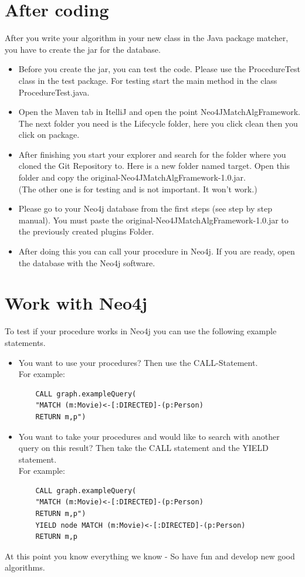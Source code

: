 \section{After coding}\label{sec:afterProgramming}
After you write your algorithm in your new class in the Java package matcher, you have to create the \glqq jar\grqq{} for the database.
\begin{itemize}
	\item Before you create the jar, you can test the code. Please use the \glqq ProcedureTest\grqq{} class in the test package. For testing start the main method in the class \glqq ProcedureTest.java\grqq{}.
	\item Open the Maven tab in \glqq ItelliJ \grqq{} and open the point \glqq Neo4JMatchAlgFramework\grqq{}. The next folder you need is the \glqq Lifecycle\grqq{} folder, here you click \glqq clean\grqq{} then you click on \glqq package\grqq{}.
	\item After finishing you start your explorer and search for the folder where you cloned the \glqq Git Repository\grqq{} to. Here is a new folder named target. Open this folder and copy the \glqq original-Neo4JMatchAlgFramework-1.0.jar\grqq{}. \\
	(The other one is for testing and is not important. It won't work.)
	\item Please go to your Neo4j database from the first steps (see step by step manual).%
	 You must paste the \glqq original-Neo4JMatchAlgFramework-1.0.jar\grqq{} to the previously created \glqq plugins\grqq{} Folder.
	\item After doing this you can call your procedure in Neo4j. If you are ready, open the database with the Neo4j software.
\end{itemize}

\section{Work with Neo4j}\label{sec:takeneo4j}
To test if your procedure works in Neo4j you can use the following example statements.
\begin{itemize}
	\item You want to use your procedures? Then use the CALL-Statement.\\
	For example:
	\begin{lstlisting}
	CALL graph.exampleQuery(
	"MATCH (m:Movie)<-[:DIRECTED]-(p:Person) 
	RETURN m,p")
	\end{lstlisting}
	\item You want to take your procedures and would like to search with another query on this result? Then take the CALL statement and the YIELD statement. \\
	For example:
	
	\begin{lstlisting}
	CALL graph.exampleQuery(
	"MATCH (m:Movie)<-[:DIRECTED]-(p:Person)
	RETURN m,p") 
	YIELD node MATCH (m:Movie)<-[:DIRECTED]-(p:Person)
	RETURN m,p
	\end{lstlisting}
\end{itemize}
At this point you know everything we know - So have fun and develop new good algorithms.
\newpage
